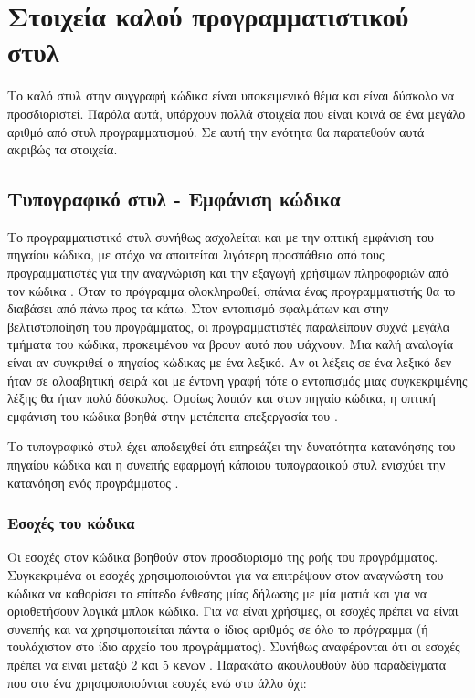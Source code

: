 \section{Στοιχεία καλού προγραμματιστικού στυλ}
Το καλό στυλ στην συγγραφή κώδικα είναι υποκειμενικό θέμα και είναι δύσκολο να προσδιοριστεί. Παρόλα αυτά, υπάρχουν πολλά στοιχεία που είναι κοινά σε ένα μεγάλο αριθμό από στυλ προγραμματισμού. Σε αυτή την ενότητα θα παρατεθούν αυτά ακριβώς τα στοιχεία.

\subsection{Τυπογραφικό στυλ - Εμφάνιση κώδικα}

Το προγραμματιστικό στυλ συνήθως ασχολείται και με την οπτική εμφάνιση του πηγαίου κώδικα, με στόχο να απαιτείται λιγότερη προσπάθεια από τους προγραμματιστές για την αναγνώριση και την εξαγωγή χρήσιμων πληροφοριών από τον κώδικα . Όταν το πρόγραμμα ολοκληρωθεί, σπάνια ένας προγραμματιστής θα το διαβάσει από πάνω προς τα κάτω. Στον εντοπισμό σφαλμάτων και στην βελτιστοποίηση του προγράμματος, οι προγραμματιστές παραλείπουν συχνά μεγάλα τμήματα του κώδικα, προκειμένου να βρουν αυτό που ψάχνουν. Μια καλή αναλογία είναι αν συγκριθεί ο πηγαίος κώδικας με ένα λεξικό. Αν οι λέξεις σε ένα λεξικό δεν ήταν σε αλφαβητική σειρά και με έντονη γραφή τότε ο εντοπισμός μιας συγκεκριμένης λέξης θα ήταν πολύ δύσκολος. Ομοίως λοιπόν και στον πηγαίο κώδικα, η οπτική εμφάνιση του κώδικα βοηθά στην μετέπειτα επεξεργασία του \cite{wiki:Programming_style,site:codding_matters}.

Το τυπογραφικό στυλ έχει αποδειχθεί ότι επηρεάζει την δυνατότητα κατανόησης του πηγαίου κώδικα και η συνεπής εφαρμογή κάποιου τυπογραφικού στυλ ενισχύει την κατανόηση ενός προγράμματος \cite{Mohan}.

\subsubsection{Εσοχές του κώδικα}

Οι εσοχές στον κώδικα βοηθούν στον προσδιορισμό της ροής του προγράμματος. Συγκεκριμένα οι εσοχές χρησιμοποιούνται για να επιτρέψουν στον αναγνώστη του κώδικα να καθορίσει το επίπεδο ένθεσης μίας δήλωσης με μία ματιά και για να οριοθετήσουν λογικά μπλοκ κώδικα. Για να είναι χρήσιμες, οι εσοχές πρέπει να είναι συνεπής και να χρησιμοποιείται πάντα ο ίδιος αριθμός σε όλο το πρόγραμμα (ή τουλάχιστον στο ίδιο αρχείο του προγράμματος). Συνήθως αναφέρονται ότι οι εσοχές πρέπει να είναι μεταξύ 2 και 5 κενών \cite{wiki:Programming_style,site:codding_matters,sutter2004c++}. Παρακάτω ακουλουθούν δύο παραδείγματα που στο ένα χρησιμοποιούνται εσοχές ενώ στο άλλο όχι:

